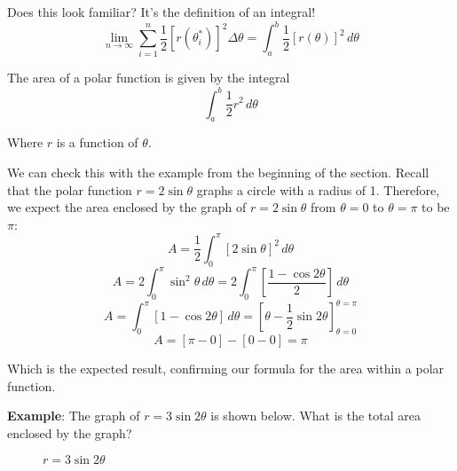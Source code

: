 Does this look familiar? It's the definition of an integral!
$$\lim_{n \to \infty} \sum_{i = 1}^n \frac{1}{2} \left[ r( \theta_i^*) \right] 
^2 \Delta \theta = \int_a^b \frac{1}{2} \left[ r(\theta) \right]^2\,d\theta$$

\begin{mdframed}[style=important, frametitle={Area of a Polar Function}]
The area of a polar function is given by the integral 
$$\int_a^b \frac{1}{2} r^2\,d\theta$$

Where $r$ is a function of $\theta$. 
\end{mdframed}

We can check this with the example from the beginning of the section. Recall 
that the polar function $r =  2\sin{\theta}$ graphs a circle with a radius of 
1. Therefore, we expect the area enclosed by the graph of $r = 2\sin{\theta}$ 
from $\theta = 0$ to $\theta = \pi$ to be $\pi$:
$$A = \frac{1}{2} \int_0^{\pi} \left[ 2\sin{\theta} \right]^2\,d\theta$$
$$A = 2 \int_0^{\pi} \sin^2{\theta}\,d\theta = 2 \int_0^{\pi} \left[ \frac{1 - 
\cos{2\theta}}{2} \right]\,d\theta$$
$$A = \int_0^{\pi} \left[ 1 - \cos{2\theta} \right]\,d\theta = \left[\theta - 
\frac{1}{2}\sin{2\theta} \right]_{\theta = 0}^{\theta = \pi}$$
$$A = \left[\pi - 0 \right] - \left[0 - 0 \right] = \pi$$

Which is the expected result, confirming our formula for the area within a 
polar function. 

\textbf{Example}: The graph of $r = 3\sin{2\theta}$ is shown below. What is 
the total area enclosed by the graph?

\begin{figure}[htbp]
\centering
    \caption{$r = 3\sin{2\theta}$}
    \label{fig:fourlobe}
\end{figure}

